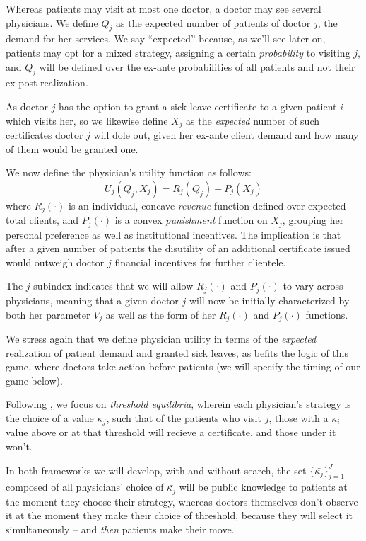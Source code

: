 \documentclass{article}
\begin{document}
Whereas patients may visit at most one doctor, a doctor may see several physicians. We define $Q_j$ as the expected number of patients of doctor $j$, the demand for her services. We say ``expected'' because, as we'll see later on, patients may opt for a mixed strategy, assigning a certain \textit{probability} to visiting $j$, and $Q_j$ will be defined over the ex-ante probabilities of all patients and not their ex-post realization.

As doctor $j$ has the option to grant a sick leave certificate to a given patient $i$ which visits her, so we likewise define $X_j$ as the \textit{expected} number of such certificates doctor $j$ will dole out, given her ex-ante client demand and how many of them would be granted one.

We now define the physician's utility function as follows:
\[
U_j(Q_j, X_j) = R_j(Q_j) - P_j(X_j)
\]
where $R_j(\cdot)$ is an individual, concave \textit{revenue} function defined over expected total clients, and $P_j(\cdot)$ is a convex \textit{punishment} function on $X_j$, grouping her personal preference as well as institutional incentives. The implication is that after a given number of patients the disutility of an additional certificate issued would outweigh doctor $j$ financial incentives for further clientele.

The $j$ subindex indicates that we will allow $R_j(\cdot)$ and $P_j(\cdot)$ to vary across physicians, meaning that a given doctor $j$ will now be initially characterized by both her parameter $V_j$ as well as the form of her $R_j(\cdot)$ and $P_j(\cdot)$ functions.

We stress again that we define physician utility in terms of the \textit{expected} realization of patient demand and granted sick leaves, as befits the logic of this game, where doctors take action before patients (we will specify the timing of our game below).

Following \cite{schnell2017physician}, we focus on \textit{threshold equilibria}, wherein each physician's strategy is the choice of a value $\bar{\kappa_j}$, such that of the patients who visit $j$, those with a $\kappa_i$ value above or at that threshold will recieve a certificate, and those under it won't.

In both frameworks we will develop, with and without search, the set $\{\bar{\kappa_j}\}_{j =1}^{J}$ composed of all physicians' choice of $\bar{\kappa_j}$ will be public knowledge to patients at the moment they choose their strategy, whereas doctors themselves don't observe it at the moment they make their choice of threshold, because they will select it simultaneously -- and \textit{then} patients make their move.
\end{document}
